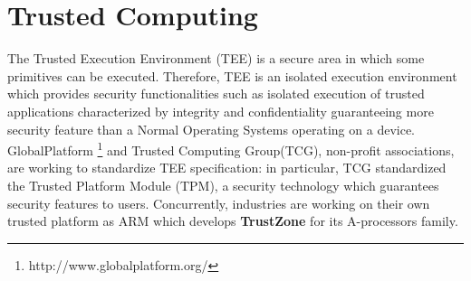 \documentclass[../tesi.tex]{subfiles}
\begin{document}
\section{Trusted Computing}
The Trusted Execution Environment (TEE) is a secure area in which some primitives can be executed. Therefore, TEE is an isolated execution environment which provides security functionalities such as isolated execution of trusted applications characterized by integrity and confidentiality guaranteeing more security feature than a Normal Operating Systems operating on a device.
GlobalPlatform \footnote{http://www.globalplatform.org/} and Trusted Computing Group(TCG), non-profit associations, are working to standardize TEE specification: in particular, TCG standardized the Trusted Platform Module (TPM), a security technology which guarantees security features to users. 
Concurrently, industries are working on their own trusted platform as ARM which develops \textbf{TrustZone} for its  A-processors family. 
\end{document}
